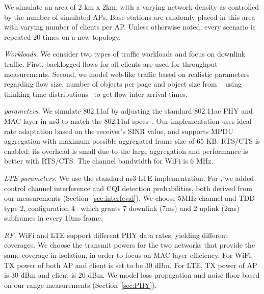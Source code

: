 


We simulate an area of 2 km x 2km, with a varying network density as controlled by the number of simulated APs. 
Base stations are randomly placed in this area with varying number of clients per AP. 
Unless otherwise noted, every scenario is repeated 20 times on a new topology. 

{\em Workloads.} We consider two types of traffic workloads and focus on downlink traffic. 
First, backlogged flows for all clients are used for throughput measurements. Second, 
we model web-like traffic based on realistic parameters regarding flow size, 
number of objects per page and object size from ~\cite{trafficmodel} using thinking time distributions~\cite{thinktime} to get flow inter arrival times. 



{\em \wf parameters.} We simulate 802.11af by adjusting the standard 802.11ac PHY and MAC layer in ns3 to match the 802.11af specs~\cite{Rice_af}. 
Our \wf implementation uses ideal rate adaptation based on the 
receiver's SINR value, and supports MPDU aggregation with maximum possible aggregated frame size of 65 KB. 
RTS/CTS is enabled; its overhead is small due to the large aggregation and \wf performance is better with RTS/CTS.
The channel bandwidth for WiFi is 6 MHz.

{\em LTE parameters.} We use the standard ns3 LTE implementation. For \cf, we added 
control channel interference and CQI detection probabilities, both derived from our measurements (Section~\ref{sec:interfeval}).
We choose 5MHz channel and TDD type 2, configuration 4~\cite{36_211} which grants 7 downlink (7ms) and 2 uplink (2ms) subframes in every 10ms frame.


{\em RF.} WiFi and LTE support different PHY data rates, yielding different coverages. 
We choose the transmit powers for the two networks that provide the same coverage in isolation, 
in order to focus on MAC-layer efficiency.
For WiFi, TX power of both AP and client is set to be 30 dBm. For LTE, TX power of AP is 30 dBm and client is 20 dBm. 
We model loss propagation and noise floor based on our range measurements (Section~\ref{sec:PHY}).



